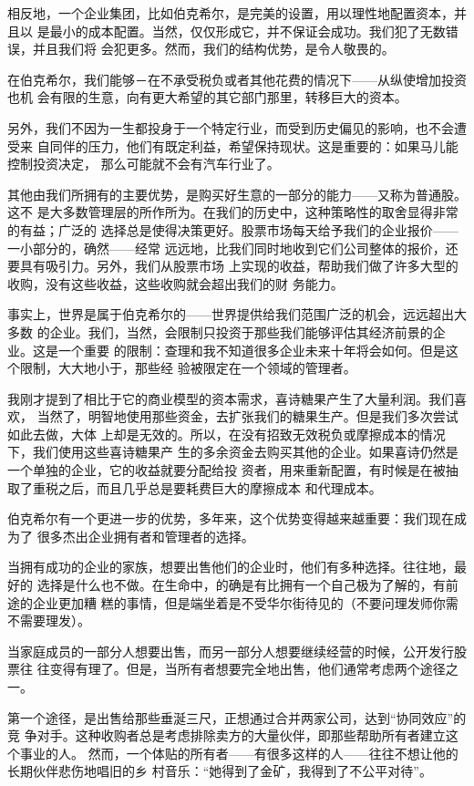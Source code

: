 \documentclass[UTF8,a4paper,zihao=-4,fontset = windows]{ctexart} %
\begin{document}
相反地，一个企业集团，比如伯克希尔，是完美的设置，用以理性地配置资本，并且以
是最小的成本配置。当然，仅仅形成它，并不保证会成功。我们犯了无数错误，并且我们将
会犯更多。然而，我们的结构优势，是令人敬畏的。

在伯克希尔，我们能够－在不承受税负或者其他花费的情况下——从纵使增加投资也机
会有限的生意，向有更大希望的其它部门那里，转移巨大的资本。

另外，我们不因为一生都投身于一个特定行业，而受到历史偏见的影响，也不会遭受来
自同伴的压力，他们有既定利益，希望保持现状。这是重要的：如果马儿能控制投资决定，
那么可能就不会有汽车行业了。

其他由我们所拥有的主要优势，是购买好生意的一部分的能力——又称为普通股。这不
是大多数管理层的所作所为。在我们的历史中，这种策略性的取舍显得非常的有益；广泛的
选择总是使得决策更好。股票市场每天给予我们的企业报价——一小部分的，确然——经常
远远地，比我们同时地收到它们公司整体的报价，还要具有吸引力。另外，我们从股票市场
上实现的收益，帮助我们做了许多大型的收购，没有这些收益，这些收购就会超出我们的财
务能力。

事实上，世界是属于伯克希尔的——世界提供给我们范围广泛的机会，远远超出大多数
的企业。我们，当然，会限制只投资于那些我们能够评估其经济前景的企业。这是一个重要
的限制：查理和我不知道很多企业未来十年将会如何。但是这个限制，大大地小于，那些经
验被限定在一个领域的管理者。

我刚才提到了相比于它的商业模型的资本需求，喜诗糖果产生了大量利润。我们喜欢，
当然了，明智地使用那些资金，去扩张我们的糖果生产。但是我们多次尝试如此去做，大体
上却是无效的。所以，在没有招致无效税负或摩擦成本的情况下，我们使用这些喜诗糖果产
生的多余资金去购买其他的企业。如果喜诗仍然是一个单独的企业，它的收益就要分配给投
资者，用来重新配置，有时候是在被抽取了重税之后，而且几乎总是要耗费巨大的摩擦成本
和代理成本。

伯克希尔有一个更进一步的优势，多年来，这个优势变得越来越重要：我们现在成为了
很多杰出企业拥有者和管理者的选择。

当拥有成功的企业的家族，想要出售他们的企业时，他们有多种选择。往往地，最好的
选择是什么也不做。在生命中，的确是有比拥有一个自己极为了解的，有前途的企业更加糟
糕的事情，但是端坐着是不受华尔街待见的（不要问理发师你需不需要理发）。

当家庭成员的一部分人想要出售，而另一部分人想要继续经营的时候，公开发行股票往
往变得有理了。但是，当所有者想要完全地出售，他们通常考虑两个途径之一。

第一个途径，是出售给那些垂涎三尺，正想通过合并两家公司，达到“协同效应”的竞
争对手。这种收购者总是考虑排除卖方的大量伙伴，即那些帮助所有者建立这个事业的人。
然而，一个体贴的所有者——有很多这样的人——往往不想让他的长期伙伴悲伤地唱旧的乡
村音乐：“她得到了金矿，我得到了不公平对待”。
\end{document}
